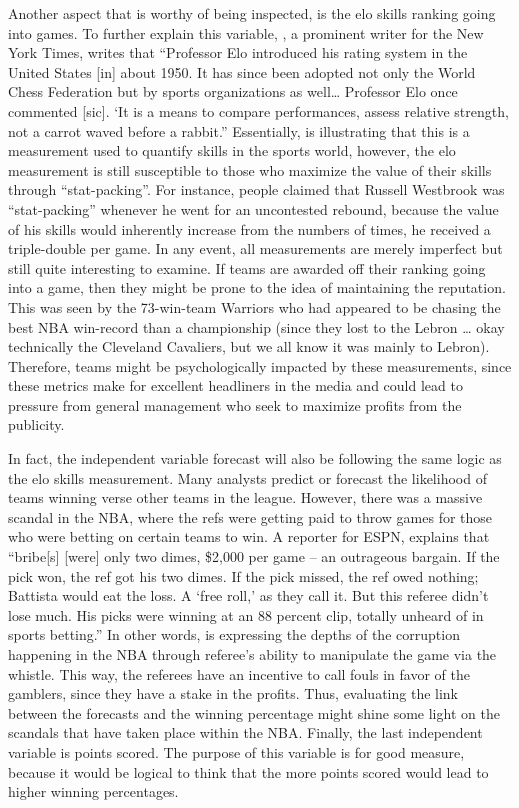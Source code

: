 \documentclass[12pt,english]{article}
\begin{document}
\par Another aspect that is worthy of being inspected, is the elo skills ranking going into games. To further explain this variable, \citet{SAX}, a prominent writer for the New York Times, writes that “Professor Elo introduced his rating system in the United States [in] about 1950. It has since been adopted not only the World Chess Federation but by sports organizations as well… Professor Elo once commented [sic]. ‘It is a means to compare performances, assess relative strength, not a carrot waved before a rabbit.” Essentially, \citet{SAX} is illustrating that this is a measurement used to quantify skills in the sports world, however, the elo measurement is still susceptible to those who maximize the value of their skills through “stat-packing”. For instance, people claimed that Russell Westbrook was “stat-packing” whenever he went for an uncontested rebound, because the value of his skills would inherently increase from the numbers of times, he received a triple-double per game. In any event, all measurements are merely imperfect but still quite interesting to examine. If teams are awarded off their ranking going into a game, then they might be prone to the idea of maintaining the reputation. This was seen by the 73-win-team Warriors who had appeared to be chasing the best NBA win-record than a championship (since they lost to the Lebron … okay technically the Cleveland Cavaliers, but we all know it was mainly to Lebron). Therefore, teams might be psychologically impacted by these measurements, since these metrics make for excellent headliners in the media and could lead to pressure from general management who seek to maximize profits from the publicity. 
\par In fact, the independent variable forecast will also be following the same logic as the elo skills measurement. Many analysts predict or forecast the likelihood of teams winning verse other teams in the league. However, there was a massive scandal in the NBA, where the refs were getting paid to throw games for those who were betting on certain teams to win. A reporter for ESPN, \citet{Scott} explains that “bribe[s] [were] only two dimes, \$2,000 per game – an outrageous bargain. If the pick won, the ref got his two dimes. If the pick missed, the ref owed nothing; Battista would eat the loss. A ‘free roll,’ as they call it. But this referee didn’t lose much. His picks were winning at an 88 percent clip, totally unheard of in sports betting.” In other words, \citet{Scott} is expressing the depths of the corruption happening in the NBA through referee’s ability to manipulate the game via the whistle. This way, the referees have an incentive to call fouls in favor of the gamblers, since they have a stake in the profits. Thus, evaluating the link between the forecasts and the winning percentage might shine some light on the scandals that have taken place within the NBA. Finally, the last independent variable is points scored. The purpose of this variable is for good measure, because it would be logical to think that the more points scored would lead to higher winning percentages. 
\end{document}
